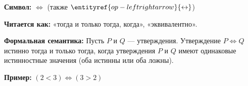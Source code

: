 
\hypertarget{term-equivalence}{}
\hypertarget{term-equivalence}{}
\begin{object} %

\textbf{Символ:} $\iff$ (также $\entityref{op-leftrightarrow}{\leftrightarrow}$)

\textbf{Читается как:} «тогда и только тогда, когда», «эквивалентно».

\textbf{Формальная семантика:}
Пусть $P$ и $Q$ — утверждения. Утверждение $P \iff Q$ истинно тогда и только тогда, когда утверждения $P$ и $Q$ имеют одинаковые истинностные значения (оба истинны или оба ложны).

\textbf{Пример:} $(2 < 3) \iff (3 > 2)$
\end{object}